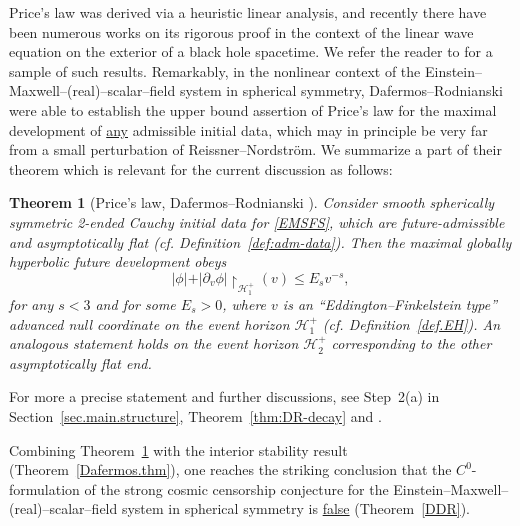 \documentclass[10pt, reqno]{amsart}
\newtheorem{theorem}{Theorem}[section]
\theoremstyle{definition}
\theoremstyle{remark}
\numberwithin{equation}{section}
\newcommand{\abs}[1]{\vert#1\vert}
\newcommand{\rd}{\partial}
\newcommand{\0}{\emptyset}
\newcommand{\calH}{\mathcal H}
\newcommand{\EH}{\calH^{+}}
\begin{document}
Price's law was derived via a heuristic linear analysis, and recently there have been numerous works on its rigorous proof in the context of the linear wave equation on the exterior of a black hole spacetime. We refer the reader to \cite{DS, DSS1, DSS2, AAG, AAG2, Ta,MTT} for a sample of such results. 
Remarkably, in the nonlinear context of the Einstein--Maxwell--(real)--scalar--field system in spherical symmetry, Dafermos--Rodnianski \cite{DRPL} were able to establish the upper bound assertion of Price's law for the maximal development of \underline{any} admissible initial data, which may in principle be very far from a small perturbation of Reissner--Nordstr\"om. We summarize a part of their theorem which is relevant for the current discussion as follows: 
\begin{theorem} [Price's law, Dafermos--Rodnianski \cite{DRPL}]\label{thm:price-law-intro}
Consider smooth spherically symmetric 2-ended Cauchy initial data for \eqref{EMSFS}, which are future-admissible and asymptotically flat (cf. Definition~\ref{def:adm-data}). Then the maximal globally hyperbolic future development obeys
\begin{equation*}
	\abs{\phi} + \abs{\rd_{v} \phi} \restriction_{\EH_{1}} (v)\leq E_{s} v^{-s},
\end{equation*}
for any $s < 3$ and for some $E_{s} > 0$, where $v$ is an ``Eddington--Finkelstein type'' advanced null coordinate on the event horizon $\EH_{1}$ (cf. Definition~\ref{def.EH}). An analogous statement holds on the event horizon $\EH_{2}$ corresponding to the other asymptotically flat end. 
\end{theorem}
For more a precise statement and further discussions, see Step~2(a) in Section~\ref{sec.main.structure}, Theorem~\ref{thm:DR-decay} and \cite[Section~5]{LO.exterior}.

Combining Theorem~\ref{thm:price-law-intro} with the interior stability result (Theorem~\ref{Dafermos.thm}), one reaches the striking conclusion that the $C^{0}$-formulation of the strong cosmic censorship conjecture for the Einstein--Maxwell--(real)--scalar--field system in spherical symmetry is \underline{false} (Theorem~\ref{DDR}). 
\end{document}
